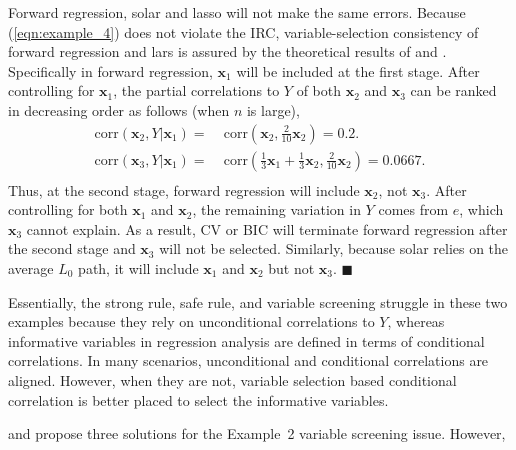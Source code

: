 \documentclass[11pt,authoryear]{elsarticle}
\begin{document}
Forward regression, solar and lasso will not make the same errors. Because (\ref{eqn:example_4}) does not violate the IRC, variable-selection consistency of forward regression and lars is assured by the theoretical results of \citet{zhang09} and \citet{zhaoyu06}. Specifically in forward regression, $\mathbf{x}_1$ will be included  at the first stage. After controlling for $\mathbf{x}_1$, the partial correlations to $Y$ of both $\mathbf{x}_2$ and $\mathbf{x}_3$ can be ranked in decreasing order as follows (when $n$ is large),
%
\begin{equation}
  \begin{aligned}
    \mathrm{corr} \left( \mathbf{x}_2, Y \vert \mathbf{x}_1 \right)  = & \;\mathrm{corr} \left( \mathbf{x}_2, \frac{2}{10} \mathbf{x}_2 \right)
    = 0.2. \\
    \mathrm{corr} \left( \mathbf{x}_3, Y \vert \mathbf{x}_1 \right)  = & \;\mathrm{corr} \left( \frac{1}{3} \mathbf{x}_1 + \frac{1}{3} \mathbf{x}_2, \frac{2}{10} \mathbf{x}_2 \right)
    = 0.0667. \\
  \end{aligned}
\end{equation}
%
Thus, at the second stage, forward regression will include $\mathbf{x}_2$, not $\mathbf{x}_3$. After controlling for both $\mathbf{x}_1$ and $\mathbf{x}_2$, the remaining variation in $Y$ comes from $e$, which $\mathbf{x}_3$ cannot explain. As a result, CV or BIC will terminate forward regression after the second stage and $\mathbf{x}_3$ will not be selected. Similarly, because solar relies on the average $L_0$ path, it will include $\mathbf{x}_1$ and $\mathbf{x}_2$ but not $\mathbf{x}_3$. $\blacksquare$

\smallskip
Essentially, the strong rule, safe rule, and variable screening struggle in these two examples because they rely on unconditional correlations to $Y$, whereas informative variables in regression analysis are defined in terms of conditional correlations. In many scenarios, unconditional and conditional correlations are aligned. However, when they are not, variable selection based conditional correlation is better placed to select the informative variables.

\citet{fan2008sure} and \citet{barut2016conditional} propose three solutions for the Example~2 variable screening issue. However,
\end{document}
